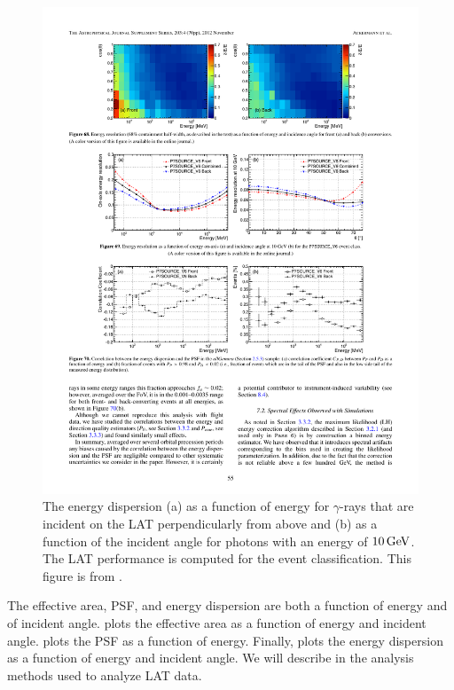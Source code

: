 \begin{figure}[htbp]
  \centering
  \includegraphics{chapters/introduction/figures/lat_energy_dispersion.pdf}
  \caption{
  The energy dispersion (a) as a function of energy for $\gamma$-rays that
  are incident on the \ac{LAT} perpendicularly from above and (b) as a function
  of the incident angle for photons with an energy of $10\,\text{GeV}$.
  The \ac{LAT} performance is computed for the \psevensourcevsix
  event classification.
  This figure is from \cite{ackermann_2012a_fermi-large}.
  }
\end{figure} 

The effective area, \ac{PSF}, and energy dispersion are both a function
of energy and of incident angle.   plots
the effective area as a function of energy and incident angle.
 plots the \ac{PSF} as a function of energy.
Finally,  plots the energy dispersion
as a function of energy and incident angle.  We will describe in
 the analysis methods used to
analyze \ac{LAT} data.
